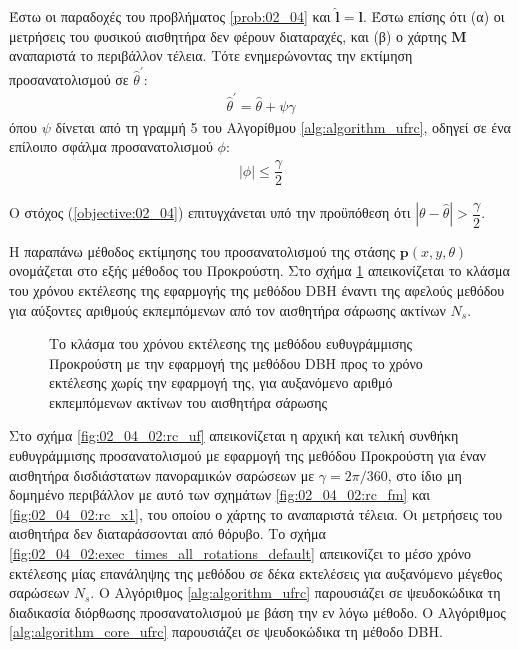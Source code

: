 \begin{lemma}
  \label{lemma:02_04_02:03}
  Έστω οι παραδοχές του προβλήματος \ref{prob:02_04} και $\hat{\bm{l}} = \bm{l}$.
  Έστω επίσης ότι (α) οι μετρήσεις του φυσικού αισθητήρα δεν φέρουν
  διαταραχές, και (β) ο χάρτης $\bm{M}$ αναπαριστά το περιβάλλον τέλεια. Τότε
  ενημερώνοντας την εκτίμηση προσανατολισμού σε
  $\hat{\theta}^\prime$:
  \begin{align}
    \hat{\theta}^\prime = \hat{\theta} + \psi \gamma \label{eq:update_t3}
  \end{align}
  όπου $\psi$ δίνεται από τη γραμμή 5 του Αλγορίθμου \ref{alg:algorithm_ufrc},
  οδηγεί σε ένα επίλοιπο σφάλμα προσανατολισμού $\phi$:
  \begin{align}
    |\phi| \leq \dfrac{\gamma}{2}  \label{eq:phi_3}
  \end{align}
\end{lemma}

\begin{corollary}
  Ο στόχος (\ref{objective:02_04}) επιτυγχάνεται υπό την προϋπόθεση ότι
  $|\theta-\hat{\theta}| > \dfrac{\gamma}{2}$.
\end{corollary}

Η παραπάνω μέθοδος εκτίμησης του προσανατολισμού της στάσης $\bm{p}(x,y,\theta)$
ονομάζεται στο εξής μέθοδος του Προκρούστη. Στο σχήμα
\ref{fig:02_04_02:ku_vs_dbh} απεικονίζεται το κλάσμα του χρόνου εκτέλεσης
της εφαρμογής της μεθόδου DBH έναντι της αφελούς μεθόδου για αύξοντες αριθμούς
εκπεμπόμενων από τον αισθητήρα σάρωσης ακτίνων $N_s$.

\begin{figure}[!h]\centering
  \vspace{1.0cm}
  
  \vspace{0.5cm}
  \caption{\small Το κλάσμα του χρόνου εκτέλεσης της μεθόδου ευθυγράμμισης
           Προκρούστη με την εφαρμογή της μεθόδου DBH προς το χρόνο εκτέλεσης
           χωρίς την εφαρμογή της, για αυξανόμενο αριθμό εκπεμπόμενων ακτίνων
           του αισθητήρα σάρωσης}
  \label{fig:02_04_02:ku_vs_dbh}
\end{figure}

Στο σχήμα \ref{fig:02_04_02:rc_uf} απεικονίζεται η αρχική και τελική συνθήκη
ευθυγράμμισης προσανατολισμού με εφαρμογή της μεθόδου Προκρούστη για έναν
αισθητήρα δισδιάστατων πανοραμικών σαρώσεων με $\gamma = 2\pi/360$, στο ίδιο μη
δομημένο περιβάλλον με αυτό των σχημάτων \ref{fig:02_04_02:rc_fm} και
\ref{fig:02_04_02:rc_x1}, του οποίου ο χάρτης το αναπαριστά τέλεια. Οι
μετρήσεις του αισθητήρα δεν διαταράσσονται από θόρυβο. Το σχήμα
\ref{fig:02_04_02:exec_times_all_rotations_default} απεικονίζει το μέσο χρόνο
εκτέλεσης μίας επανάληψης της μεθόδου σε δέκα εκτελέσεις για αυξανόμενο μέγεθος
σαρώσεων $N_s$. Ο Αλγόριθμος \ref{alg:algorithm_ufrc} παρουσιάζει σε
ψευδοκώδικα τη διαδικασία διόρθωσης προσανατολισμού με βάση την εν λόγω μέθοδο.
Ο Αλγόριθμος \ref{alg:algorithm_core_ufrc} παρουσιάζει σε ψευδοκώδικα τη μέθοδο
DBH.

